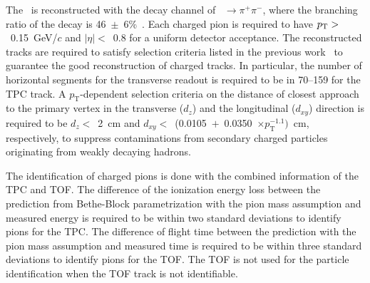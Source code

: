 The \fzero~is reconstructed with the decay channel of \fzero~$\rightarrow \pi^{+}\pi^{-}$, where the branching ratio of the decay is 46~$\pm$~6\%~\cite{Stone:2013eaa}. Each charged pion is required to have $p_{\rm{T}}>$~0.15~GeV/$c$ and $|\eta|<$~0.8 for a uniform detector acceptance. The reconstructed tracks are required to satisfy selection criteria listed in the previous work~\cite{ALICE:2018qdv} to guarantee the good reconstruction of charged tracks. In particular, the number of horizontal segments for the transverse readout is required to be in 70--159 for the TPC track. A $p_{\mathrm{T}}$-dependent selection criteria on the distance of closest approach to the primary vertex in the transverse ($d_{z}$) and the longitudinal ($d_{xy}$) direction is required to be $d_{z}<$~2~cm and $d_{xy}<$~(0.0105~$+$~0.0350~$\times p_{\mathrm{T}}^{-1.1})$~cm, respectively, to suppress contaminations from secondary charged particles originating from weakly decaying hadrons.

The identification of charged pions is done with the combined information of the TPC and TOF. The difference of the ionization energy loss between the prediction from Bethe-Block parametrization with the pion mass assumption and measured energy is required to be within two standard deviations to identify pions for the TPC. The difference of flight time between the prediction with the pion mass assumption and measured time is required to be within three standard deviations to identify pions for the TOF. The TOF is not used for the particle identification when the TOF track is not identifiable.

